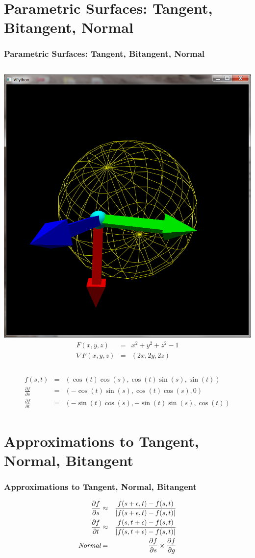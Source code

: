 \documentclass[slidestop,xcolor=pst]{beamer}
\newcommand{\sect}[1]{
\section{#1}
\begin{frame}[fragile]\frametitle{#1}
}
\begin{document}
\sect{Parametric Surfaces: Tangent, Bitangent, Normal}
\begin{columns}[c]
\includegraphics[width=\textwidth]{images/vpythonpsphere.png}
\begin{eqnarray*}
F(x,y,z) &=& x^2 + y^2 + z^2 - 1 \\
\nabla F(x,y,z) &=& (2x, 2y, 2z)
\end{eqnarray*}
\end{columns}
\begin{eqnarray*}
f(s,t) &=& (\cos(t)\cos(s),\cos(t)\sin(s),\sin(t))\\
\frac{\partial f}{\partial s} &=& (-\cos(t)\sin(s),
                                   \cos(t)\cos(s),
                                   0)\\
\frac{\partial f}{\partial t} &=& (-\sin(t)\cos(s),
                                   -\sin(t)\sin(s),
                                    \cos(t))\\
\end{eqnarray*}
\end{frame}

\sect{Approximations to Tangent, Normal, Bitangent}
\begin{eqnarray*}
\frac{\partial f}{\partial s} &\approx&
\frac{f(s+\epsilon, t) - f(s,t)}{|f(s+\epsilon, t) - f(s,t)|}\\
\frac{\partial f}{\partial t} &\approx&
\frac{f(s, t+\epsilon) - f(s,t)}{|f(s, t+\epsilon) - f(s,t)|}\\
\mbox{\it Normal} &=& \frac{\partial f}{\partial s} \times \frac{\partial f}{\partial g}
\end{eqnarray*}
\end{frame}
\end{document}
